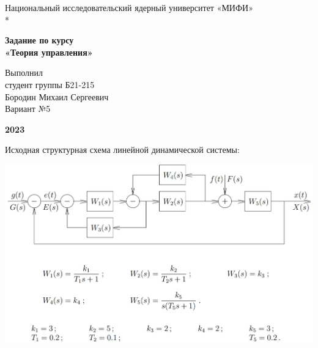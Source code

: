\documentclass[a4paper,12pt]{article}
\renewcommand{\^}[2]{#1^{\, #2} \kern -1pt}
\newcommand{\1}{\kern 1pt}
\newcommand{\0}{\kern -1pt}
\begin{document}
	
	\begin{titlepage}
		\begin{center}
			\small{Национальный исследовательский ядерный университет «МИФИ»}\\*
		\end{center}
		\vspace{7cm}
		
		\begin{center}
			\Large{\textbf{Задание по курсу}\\
				\textbf{«Теория управления»}}
		\end{center}
		\vspace{2cm}
		
		\begin{flushright}
			Выполнил\\
			студент группы Б21-215\\
			Бородин Михаил Сергеевич\\
			\vspace{0.5cm}
			Вариант №5
		\end{flushright}
		\vspace{8cm}
		
		\begin{center}
			\textbf{2023}
		\end{center}
	\end{titlepage}


	\newpage 
	\setcounter{page}{2}
	
	
	Исходная структурная схема линейной динамической системы:
	
	\begin{center}
		\includegraphics[scale=0.6,page=1]{исходная_схема}
	\end{center}
	
	\newpage
	
\end{document}
